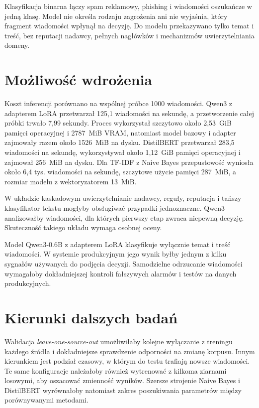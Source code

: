 Klasyfikacja binarna łączy spam reklamowy, phishing i wiadomości oszukańcze w
jedną klasę. Model nie określa rodzaju zagrożenia ani nie wyjaśnia, który
fragment wiadomości wpłynął na decyzję. Do modelu przekazywano tylko temat i
treść, bez reputacji nadawcy, pełnych nagłówków i mechanizmów uwierzytelniania
domeny.

\section{Możliwość wdrożenia}

Koszt inferencji porównano na wspólnej próbce 1000 wiadomości. Qwen3 z
adapterem LoRA przetwarzał 125,1 wiadomości na sekundę, a przetworzenie całej
próbki trwało 7,99 sekundy. Proces wykorzystał szczytowo około 2,53~GiB pamięci
operacyjnej i 2787~MiB VRAM, natomiast model bazowy i adapter zajmowały razem
około 1526~MiB na dysku. DistilBERT przetwarzał 283,5 wiadomości na sekundę,
wykorzystywał około 1,12~GiB pamięci operacyjnej i zajmował 256~MiB na dysku.
Dla TF-IDF z Naive Bayes przepustowość wyniosła około 6,4 tys. wiadomości na
sekundę, szczytowe użycie pamięci 287~MiB, a rozmiar modelu z wektoryzatorem
13~MiB.

W układzie kaskadowym uwierzytelnianie nadawcy, reguły, reputacja i tańszy
klasyfikator tekstu mogłyby obsługiwać przypadki jednoznaczne. Qwen3
analizowałby wiadomości, dla których pierwszy etap zwraca niepewną decyzję.
Skuteczność takiego układu wymaga osobnej oceny.

Model Qwen3-0.6B z adapterem LoRA klasyfikuje wyłącznie temat i treść
wiadomości. W systemie produkcyjnym jego wynik byłby jednym z kilku sygnałów
używanych do podjęcia decyzji. Samodzielne odrzucanie wiadomości wymagałoby
dokładniejszej kontroli fałszywych alarmów i testów na danych produkcyjnych.

\section{Kierunki dalszych badań}

Walidacja \emph{leave-one-source-out} umożliwiłaby kolejne wyłączanie z treningu
każdego źródła i dokładniejsze sprawdzenie odporności na zmianę korpusu. Innym
kierunkiem jest podział czasowy, w którym do testu trafiają nowsze wiadomości.
Te same konfiguracje należałoby również wytrenować z kilkoma ziarnami losowymi,
aby oszacować zmienność wyników. Szersze strojenie Naive Bayes i DistilBERT
wyrównałoby natomiast zakres poszukiwania parametrów między porównywanymi
metodami.

